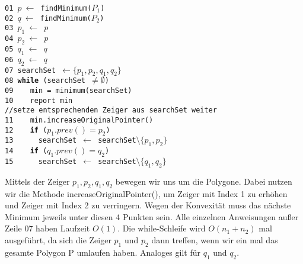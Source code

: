 \documentclass{article}
\begin{document}
\begin{minipage}{.6\textwidth}
\texttt{01 $p\ \leftarrow$ findMinimum($P_1$)\\
02 $q\ \leftarrow$ findMinimum($P_2$)\\
03 $p_{1}\ \leftarrow$ $p$\\
04 $p_{2}\ \leftarrow$ $p$\\
05 $q_{1}\ \leftarrow$ $q$\\
06 $q_{2}\ \leftarrow$ $q$\\
07 searchSet $\leftarrow \{p_1,p_2,q_1,q_2\}$\\
08 {\bf while} (searchSet $\neq \emptyset$)\\
09 $\quad$ min = minimum(searchSet)\\
10 $\quad$ report min\\
//setze entsprechenden Zeiger aus searchSet weiter\\
11 $\quad$ min.increaseOriginalPointer()\\
12 $\quad$ {\bf if} ($p_1.prev() = p_2$)\\
13 $\quad\quad$ searchSet $\leftarrow$ searchSet$\setminus \{p_1,p_2\}$\\
14 $\quad$ {\bf if} ($q_1.prev() = q_2$)\\
15 $\quad\quad$ searchSet $\leftarrow$ searchSet$\setminus \{q_1,q_2\}$
}
\end{minipage}
\begin{minipage}{.4\textwidth}
Mittels der Zeiger $p_1,p_2,q_1,q_2$ bewegen wir uns um die Polygone. Dabei nutzen wir die Methode increaseOriginalPointer(), um Zeiger mit Index 1 zu erh\"ohen und Zeiger mit Index 2 zu verringern. Wegen der Konvexit\"at muss das n\"achste Minimum jeweils unter diesen 4 Punkten sein. Alle einzelnen Anweisungen au\ss er Zeile 07 haben Laufzeit $O(1)$. Die while-Schleife wird $O(n_1 + n_2)$ mal ausgef\"uhrt, da sich die Zeiger $p_1$ und $p_2$ dann treffen, wenn wir ein mal das gesamte Polygon P umlaufen haben. Analoges gilt f\"ur $q_1$ und $q_2$.
\end{minipage}\\
\end{document}
